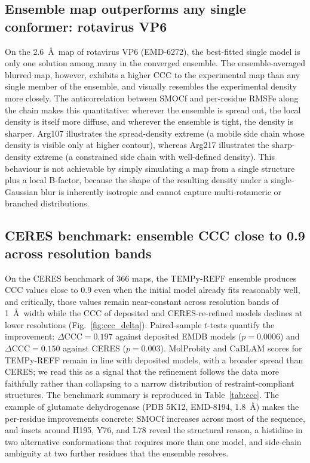 \documentclass[11pt]{article}
\begin{document}
\subsection{Ensemble map outperforms any single conformer: rotavirus VP6}
On the 2.6~\AA\ map of rotavirus VP6 (EMD-6272), the best-fitted single model is only one solution among many in the converged ensemble. The ensemble-averaged blurred map, however, exhibits a higher CCC to the experimental map than any single member of the ensemble, and visually resembles the experimental density more closely. The anticorrelation between SMOCf and per-residue RMSFe along the chain makes this quantitative: wherever the ensemble is spread out, the local density is itself more diffuse, and wherever the ensemble is tight, the density is sharper. Arg107 illustrates the spread-density extreme (a mobile side chain whose density is visible only at higher contour), whereas Arg217 illustrates the sharp-density extreme (a constrained side chain with well-defined density). This behaviour is not achievable by simply simulating a map from a single structure plus a local B-factor, because the shape of the resulting density under a single-Gaussian blur is inherently isotropic and cannot capture multi-rotameric or branched distributions.

\subsection{CERES benchmark: ensemble CCC close to 0.9 across resolution bands}
On the CERES benchmark of 366 maps, the TEMPy-REFF ensemble produces CCC values close to 0.9 even when the initial model already fits reasonably well, and critically, those values remain near-constant across resolution bands of 1~\AA\ width while the CCC of deposited and CERES-re-refined models declines at lower resolutions (Fig.~\ref{fig:ccc_delta}). Paired-sample $t$-tests quantify the improvement: $\Delta\mathrm{CCC}=0.197$ against deposited EMDB models ($p=0.0006$) and $\Delta\mathrm{CCC}=0.150$ against CERES ($p=0.003$). MolProbity and CaBLAM scores for TEMPy-REFF remain in line with deposited models, with a broader spread than CERES; we read this as a signal that the refinement follows the data more faithfully rather than collapsing to a narrow distribution of restraint-compliant structures. The benchmark summary is reproduced in Table~\ref{tab:ccc}. The example of glutamate dehydrogenase (PDB 5K12, EMD-8194, 1.8~\AA) makes the per-residue improvements concrete: SMOCf increases across most of the sequence, and insets around H195, Y76, and L78 reveal the structural reason, a histidine in two alternative conformations that requires more than one model, and side-chain ambiguity at two further residues that the ensemble resolves.
\end{document}
